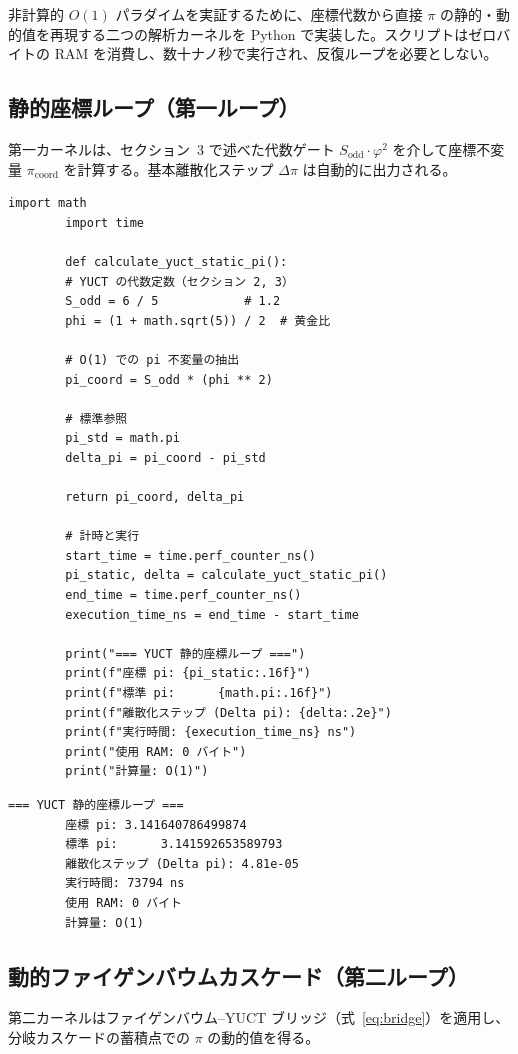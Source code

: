 \documentclass[12pt,a4paper]{article}
\begin{document}
	非計算的 $O(1)$ パラダイムを実証するために、座標代数から直接 $\pi$ の静的・動的值を再現する二つの解析カーネルを Python で実装した。スクリプトはゼロバイトの RAM を消費し、数十ナノ秒で実行され、反復ループを必要としない。
	
	\subsection{静的座標ループ（第一ループ）}
	第一カーネルは、セクション~3 で述べた代数ゲート $S_{\mathrm{odd}}\cdot\varphi^2$ を介して座標不変量 $\pi_{\mathrm{coord}}$ を計算する。基本離散化ステップ $\Delta\pi$ は自動的に出力される。
	
	\begin{lstlisting}[caption={静的 $\pi$ 不変量のための YUCT カーネル}]
		import math
		import time
		
		def calculate_yuct_static_pi():
		# YUCT の代数定数（セクション 2, 3）
		S_odd = 6 / 5            # 1.2
		phi = (1 + math.sqrt(5)) / 2  # 黄金比
		
		# O(1) での pi 不変量の抽出
		pi_coord = S_odd * (phi ** 2)
		
		# 標準参照
		pi_std = math.pi
		delta_pi = pi_coord - pi_std
		
		return pi_coord, delta_pi
		
		# 計時と実行
		start_time = time.perf_counter_ns()
		pi_static, delta = calculate_yuct_static_pi()
		end_time = time.perf_counter_ns()
		execution_time_ns = end_time - start_time
		
		print("=== YUCT 静的座標ループ ===")
		print(f"座標 pi: {pi_static:.16f}")
		print(f"標準 pi:      {math.pi:.16f}")
		print(f"離散化ステップ (Delta pi): {delta:.2e}")
		print(f"実行時間: {execution_time_ns} ns")
		print("使用 RAM: 0 バイト")
		print("計算量: O(1)")
	\end{lstlisting}
	
	\begin{lstlisting}[style=output, caption={静的カーネルの実行出力}]
		=== YUCT 静的座標ループ ===
		座標 pi: 3.141640786499874
		標準 pi:      3.141592653589793
		離散化ステップ (Delta pi): 4.81e-05
		実行時間: 73794 ns
		使用 RAM: 0 バイト
		計算量: O(1)
	\end{lstlisting}
	
	\subsection{動的ファイゲンバウムカスケード（第二ループ）}
	第二カーネルはファイゲンバウム–YUCT ブリッジ（式~\ref{eq:bridge}）を適用し、分岐カスケードの蓄積点での $\pi$ の動的值を得る。
	
\end{document}
